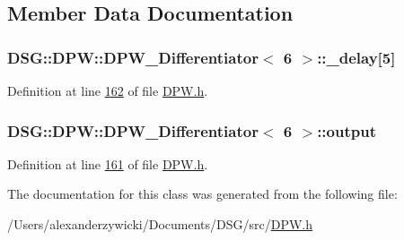 \subsection{Member Data Documentation}
\hypertarget{class_d_s_g_1_1_d_p_w_1_1_d_p_w___differentiator_3_016_01_4_a8f3e45aa44791b711f6e71aff92505ca}{
\subsubsection[{\+\_\+delay}]{ {\bf D\+S\+G\+::\+D\+P\+W\+::\+D\+P\+W\+\_\+\+Differentiator}$<$ 6 $>$\+::\+\_\+delay\mbox{[}5\mbox{]}\hspace{0.3cm}{\ttfamily [protected]}}}\label{class_d_s_g_1_1_d_p_w_1_1_d_p_w___differentiator_3_016_01_4_a8f3e45aa44791b711f6e71aff92505ca}


Definition at line \hyperlink{_d_p_w_8h_source_l00162}{162} of file \hyperlink{_d_p_w_8h_source}{D\+P\+W.\+h}.

\hypertarget{class_d_s_g_1_1_d_p_w_1_1_d_p_w___differentiator_3_016_01_4_a6939d53801d66571b5935bcd5561548a}{
\subsubsection[{output}]{ {\bf D\+S\+G\+::\+D\+P\+W\+::\+D\+P\+W\+\_\+\+Differentiator}$<$ 6 $>$\+::output\hspace{0.3cm}{\ttfamily [protected]}}}\label{class_d_s_g_1_1_d_p_w_1_1_d_p_w___differentiator_3_016_01_4_a6939d53801d66571b5935bcd5561548a}


Definition at line \hyperlink{_d_p_w_8h_source_l00161}{161} of file \hyperlink{_d_p_w_8h_source}{D\+P\+W.\+h}.



The documentation for this class was generated from the following file\+:\begin{DoxyCompactItemize}
\item 
/\+Users/alexanderzywicki/\+Documents/\+D\+S\+G/src/\hyperlink{_d_p_w_8h}{D\+P\+W.\+h}\end{DoxyCompactItemize}

